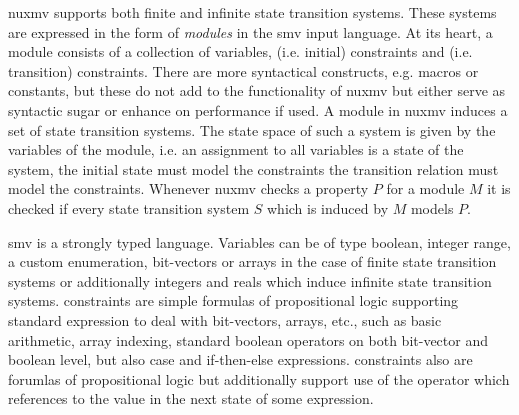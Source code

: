 \gls{nuxmv} supports both finite and infinite state transition systems.
These systems are expressed in the form of \textit{modules} in the \gls{smv} input language.
At its heart, a module consists of a collection of variables,  (i.e. initial) constraints and  (i.e. transition) constraints.
There are more syntactical constructs, e.g. macros or constants, but these do not add to the functionality of \gls{nuxmv} but either serve as syntactic sugar or enhance on performance if used.
A module in \gls{nuxmv} induces a set of state transition systems.
The state space of such a system is given by the variables of the module, i.e. an assignment to all variables is a state of the system, the initial state must model the  constraints the transition relation must model the  constraints.
Whenever \gls{nuxmv} checks a property $ P $ for a module $ M $ it is checked if every state transition system $ S $ which is induced by $ M $ models $ P $.

\gls{smv} is a strongly typed language.
Variables can be of type boolean, integer range, a custom enumeration, bit-vectors or arrays in the case of finite state transition systems or additionally integers and reals which induce infinite state transition systems.
 constraints are simple formulas of propositional logic supporting standard expression to deal with bit-vectors, arrays, etc., such as basic arithmetic, array indexing, standard boolean operators on both bit-vector and boolean level, but also case and if-then-else expressions.
 constraints also are forumlas of propositional logic but additionally support use of the  operator which references to the value in the next state of some expression.

